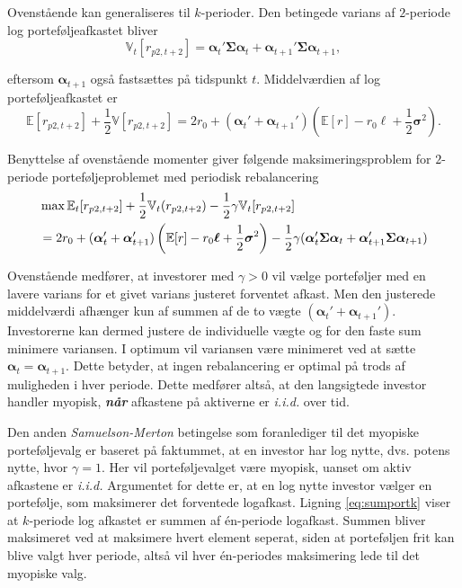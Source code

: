 \documentclass[
  a4paper,
  oneside]{memoir}
\begin{document}
Ovenstående kan generaliseres til \(k\)-perioder. Den betingede varians af \(2\)-periode log porteføljeafkastet bliver
\[\mathbb{V}_t[r_{p2,t+2}]=\bm{\alpha}_t'\bm{\Sigma}\bm{\alpha}_t+\bm{\alpha}_{t+1}'\bm{\Sigma}\bm{\alpha}_{t+1},\]

eftersom \(\bm{\alpha}_{t+1}\) også fastsættes på tidspunkt \(t\). Middelværdien af log porteføljeafkastet er
\[\mathbb{E}[r_{p2,t+2}]+\frac{1}{2}\mathbb{V}[r_{p2,t+2}]=2r_0 + (\bm{\alpha}_t'+\bm{\alpha}_{t+1}')(\mathbb{E}[r]-r_0\bm{\ell}+\frac{1}{2}\bm{\sigma}^2).\]

Benyttelse af ovenstående momenter giver følgende maksimeringsproblem for \(2\)-periode porteføljeproblemet med periodisk rebalancering
\begin{align}
&\max\mathbb{E}_t[r_{p2,t+2}] + \frac{1}{2} \mathbb{V}_t(r_{p2,t+2})-\frac{1}{2}\gamma \mathbb{V}_t[r_{p2,t+2}]\notag \\
&=2r_0+(\bm{\alpha}_t'+\bm{\alpha}_{t+1}')\left(\mathbb{E}[r]-r_0\bm{\ell}+\frac{1}{2}\bm{\sigma}^2\right)-\frac{1}{2}\gamma (\bm{\alpha}_t'\bm{\Sigma}\bm{\alpha}_t+\bm{\alpha}_{t+1}'\bm{\Sigma}\bm{\alpha}_{t+1})
\label{eq:CRRAmakslogk2periode}
\end{align}

Ovenstående medfører, at investorer med \(\gamma>0\) vil vælge porteføljer med en lavere varians for et givet varians justeret forventet afkast. Men den justerede middelværdi afhænger kun af summen af de to vægte \((\bm{\alpha}_t'+\bm{\alpha}_{t+1}')\). Investorerne kan dermed justere de individuelle vægte og for den faste sum minimere variansen. I optimum vil variansen være minimeret ved at sætte \(\bm{\alpha}_t=\bm{\alpha}_{t+1}\). Dette betyder, at ingen rebalancering er optimal på trods af muligheden i hver periode. Dette medfører altså, at den langsigtede investor handler myopisk, \textbf{\emph{når}} afkastene på aktiverne er \emph{i.i.d.} over tid.

Den anden \emph{Samuelson-Merton} betingelse som foranlediger til det myopiske porteføljevalg er baseret på faktummet, at en investor har log nytte, dvs. potens nytte, hvor \(\gamma=1\). Her vil porteføljevalget være myopisk, uanset om aktiv afkastene er \emph{i.i.d.} Argumentet for dette er, at en log nytte investor vælger en portefølje, som maksimerer det forventede logafkast. Ligning \eqref{eq:sumportk} viser at \(k\)-periode log afkastet er summen af én-periode logafkast. Summen bliver maksimeret ved at maksimere hvert element seperat, siden at porteføljen frit kan blive valgt hver periode, altså vil hver én-periodes maksimering lede til det myopiske valg.
\end{document}
